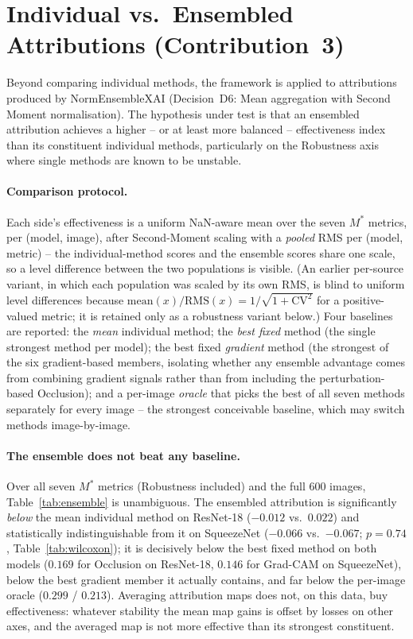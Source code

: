\section{Individual vs.\ Ensembled Attributions (Contribution~3)}
\label{sec:exp-ensemble}

Beyond comparing individual methods, the framework is applied to attributions
produced by NormEnsembleXAI (Decision~D6: Mean aggregation with Second Moment
normalisation). The hypothesis under test is that an ensembled attribution
achieves a higher -- or at least more balanced -- effectiveness index than its
constituent individual methods, particularly on the Robustness axis where
single methods are known to be unstable.

\paragraph{Comparison protocol.} Each side's effectiveness is a uniform
NaN-aware mean over the seven $M^{*}$ metrics, per (model, image), after
Second-Moment scaling with a \emph{pooled} RMS per (model, metric) -- the
individual-method scores and the ensemble scores share one scale, so a level
difference between the two populations is visible. (An earlier per-source
variant, in which each population was scaled by its own RMS, is blind to
uniform level differences because $\mathrm{mean}(x)/\mathrm{RMS}(x) =
1/\sqrt{1 + \mathrm{CV}^2}$ for a positive-valued metric; it is retained
only as a robustness variant below.) Four baselines are reported: the
\emph{mean} individual method; the \emph{best fixed} method (the single
strongest method per model); the best fixed \emph{gradient} method (the
strongest of the six gradient-based members, isolating whether any
ensemble advantage comes from combining gradient signals rather than from
including the perturbation-based Occlusion); and a
per-image \emph{oracle} that picks the best of all seven methods separately
for every image -- the strongest conceivable baseline, which may switch
methods image-by-image.



\paragraph{The ensemble does not beat any baseline.} Over all seven $M^{*}$
metrics (Robustness included) and the
full 600 images, Table~\ref{tab:ensemble} is unambiguous.
The ensembled attribution is significantly \emph{below} the mean individual
method on ResNet-18 ($-0.012$ vs.\ $0.022$) and statistically
indistinguishable from it on SqueezeNet ($-0.066$ vs.\ $-0.067$;
$p = 0.74$, Table~\ref{tab:wilcoxon}); it is decisively below the best
fixed method on both models ($0.169$ for Occlusion on ResNet-18, $0.146$
for Grad-CAM on SqueezeNet), below the best gradient member it actually
contains, and far below the per-image oracle ($0.299$ / $0.213$).
Averaging attribution maps does not, on this data, buy effectiveness:
whatever stability the mean map gains is offset by losses on other axes,
and the averaged map is not more effective than its strongest constituent.

